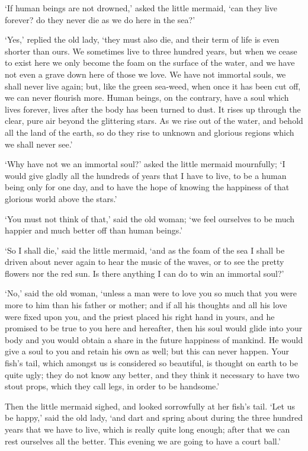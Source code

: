 `If human beings are not drowned,' asked the little mermaid, `can they live forever? do they never die as we do here in the sea?'

`Yes,' replied the old lady, `they must also die, and their term of life is even shorter than ours.
We sometimes live to three hundred years, but when we cease to exist here we only become the foam on the surface of the water, and we have not even a grave down here of those we love.
We have not immortal souls, we shall never live again; but, like the green sea-weed, when once it has been cut off, we can never flourish more.
Human beings, on the contrary, have a soul which lives forever, lives after the body has been turned to dust.
It rises up through the clear, pure air beyond the glittering stars.
As we rise out of the water, and behold all the land of the earth, so do they rise to unknown and glorious regions which we shall never see.'

`Why have not we an immortal soul?' asked the little mermaid mournfully; `I would give gladly all the hundreds of years that I have to live, to be a human being only for one day, and to have the hope of knowing the happiness of that glorious world above the stars.'

`You must not think of that,' said the old woman; `we feel ourselves to be much happier and much better off than human beings.'

`So I shall die,' said the little mermaid, `and as the foam of the sea I shall be driven about never again to hear the music of the waves, or to see the pretty flowers nor the red sun.
Is there anything I can do to win an immortal soul?'

`No,' said the old woman, `unless a man were to love you so much that you were more to him than his father or mother; and if all his thoughts and all his love were fixed upon you, and the priest placed his right hand in yours, and he promised to be true to you here and hereafter, then his soul would glide into your body and you would obtain a share in the future happiness of mankind.
He would give a soul to you and retain his own as well; but this can never happen.
Your fish’s tail, which amongst us is considered so beautiful, is thought on earth to be quite ugly; they do not know any better, and they think it necessary to have two stout props, which they call legs, in order to be handsome.'

Then the little mermaid sighed, and looked sorrowfully at her fish’s tail.
`Let us be happy,' said the old lady, `and dart and spring about during the three hundred years that we have to live, which is really quite long enough; after that we can rest ourselves all the better.
This evening we are going to have a court ball.'

